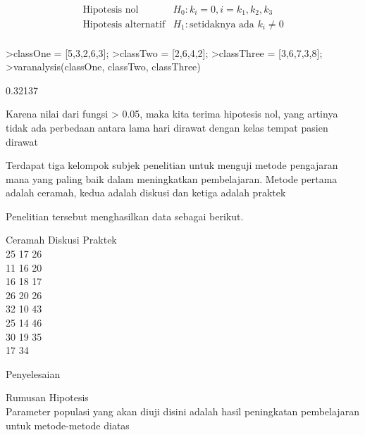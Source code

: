 \documentclass[a4paper,10pt]{article}
\begin{document}
\begin{eulernotebook}
\begin{eulercomment}
\begin{eulercomment}
\begin{eulercomment}
\begin{eulercomment}
\begin{eulercomment}
\begin{eulercomment}
\begin{eulercomment}
\end{eulercomment}
\begin{eulerformula}
\[
\begin{array}{cc} \text{Hipotesis nol} & H_0: k_i = 0, i = k_1, k_2, k_3 \\ \text{Hipotesis alternatif} & H_1: \text{setidaknya ada } k_i \ne 0 \\ \end{array}
\]
\end{eulerformula}
\begin{eulerprompt}
>classOne = [5,3,2,6,3];
>classTwo = [2,6,4,2];
>classThree = [3,6,7,3,8];
>varanalysis(classOne, classTwo, classThree)
\end{eulerprompt}
\begin{euleroutput}
  0.32137
\end{euleroutput}
\begin{eulercomment}
Karena nilai dari fungsi \textgreater{} 0.05, maka kita terima hipotesis nol, yang
artinya tidak ada perbedaan antara lama hari dirawat dengan kelas
tempat pasien dirawat
\end{eulercomment}
\begin{eulercomment}
Terdapat tiga kelompok subjek penelitian untuk menguji metode
pengajaran mana yang paling baik dalam meningkatkan pembelajaran.
Metode pertama adalah ceramah, kedua adalah diskusi dan ketiga adalah
praktek

Penelitian tersebut menghasilkan data sebagai berikut.

Ceramah \textbar{} Diskusi \textbar{} Praktek\\
25      \textbar{} 17      \textbar{} 26\\
11      \textbar{} 16      \textbar{} 20\\
16      \textbar{} 18      \textbar{} 17\\
26      \textbar{} 20      \textbar{} 26\\
32      \textbar{} 10      \textbar{} 43\\
25      \textbar{} 14      \textbar{} 46\\
30      \textbar{} 19      \textbar{} 35\\
17                \textbar{} 34

Penyelesaian

Rumusan Hipotesis\\
Parameter populasi yang akan diuji disini adalah hasil peningkatan
pembelajaran untuk metode-metode diatas


\end{eulercomment}
\end{eulercomment}
\end{eulercomment}
\end{eulercomment}
\end{eulercomment}
\end{eulercomment}
\end{eulercomment}
\end{eulernotebook}
\end{document}
